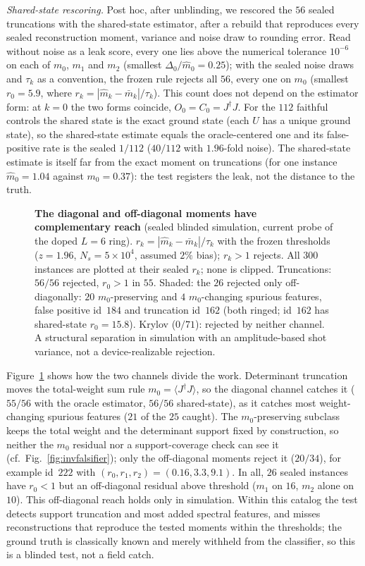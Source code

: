 \documentclass[submission, PhysCore]{SciPost}
\newcommand{\onecolfig}{\setlength{\columnwidth}{0.65\textwidth}}
\begin{document}
\emph{Shared-state rescoring.} Post hoc, after unblinding, we rescored the $56$ sealed truncations with the shared-state estimator, after a rebuild that reproduces every sealed reconstruction moment, variance and noise draw to rounding error. Read without noise as a leak score, every one lies above the numerical tolerance $10^{-6}$ on each of $m_0$, $m_1$ and $m_2$ (smallest $\Delta_0/\widehat m_0=0.25$); with the sealed noise draws and $\tau_k$ as a convention, the frozen rule rejects all $56$, every one on $m_0$ (smallest $r_0=5.9$, where $r_k=|\widehat m_k-\bar m_k|/\tau_k$). This count does not depend on the estimator form: at $k=0$ the two forms coincide, $O_0=C_0=J^\dagger J$. For the $112$ faithful controls the shared state is the exact ground state (each $U$ has a unique ground state), so the shared-state estimate equals the oracle-centered one and its false-positive rate is the sealed $1/112$ ($40/112$ with $1.96$-fold noise). The shared-state estimate is itself far from the exact moment on truncations (for one instance $\widehat m_0=1.04$ against $m_0=0.37$): the test registers the leak, not the distance to the truth.

\begin{figure}[t]
\centering\onecolfig

\caption{\textbf{The diagonal and off-diagonal moments have complementary reach} (sealed blinded simulation, current probe of the doped $L=6$ ring). $r_k=|\widehat m_k-\bar m_k|/\tau_k$ with the frozen thresholds ($z=1.96$, $N_s=5\times10^4$, assumed $2\%$ bias); $r_k>1$ rejects. All $300$ instances are plotted at their sealed $r_k$; none is clipped. Truncations: $56/56$ rejected, $r_0>1$ in $55$. Shaded: the $26$ rejected only off-diagonally: $20$ $m_0$-preserving and $4$ $m_0$-changing spurious features, false positive id~$184$ and truncation id~$162$ (both ringed; id~$162$ has shared-state $r_0=15.8$). Krylov ($0/71$): rejected by neither channel. A structural separation in simulation with an amplitude-based shot variance, not a device-realizable rejection.}
\label{fig:separating}
\end{figure}

Figure~\ref{fig:separating} shows how the two channels divide the work. Determinant truncation moves the total-weight sum rule $m_0=\langle J^\dagger J\rangle$, so the diagonal channel catches it ($55/56$ with the oracle estimator, $56/56$ shared-state), as it catches most weight-changing spurious features ($21$ of the $25$ caught). The $m_0$-preserving subclass keeps the total weight and the determinant support fixed by construction, so neither the $m_0$ residual nor a support-coverage check can see it (cf.\ Fig.~\ref{fig:invfalsifier}); only the off-diagonal moments reject it ($20/34$), for example id~$222$ with $(r_0,r_1,r_2)=(0.16,3.3,9.1)$. In all, $26$ sealed instances have $r_0<1$ but an off-diagonal residual above threshold ($m_1$ on $16$, $m_2$ alone on $10$). This off-diagonal reach holds only in simulation. Within this catalog the test detects support truncation and most added spectral features, and misses reconstructions that reproduce the tested moments within the thresholds; the ground truth is classically known and merely withheld from the classifier, so this is a blinded test, not a field catch.
\end{document}
